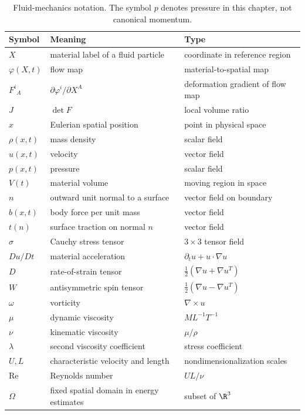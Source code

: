 \begin{table}[htbp]
\centering
\caption{Fluid-mechanics notation. The symbol \(p\) denotes pressure in this
chapter, not canonical momentum.}
\label{tab:fluid-notation}
\small
\begin{tabular}{p{}p{}p{}}
\toprule
Symbol & Meaning & Type\\
\midrule
\(X\) & material label of a fluid particle & coordinate in reference region\\
\(\varphi(X,t)\) & flow map & material-to-spatial map\\
\(F^i{}_A\) & \(\partial\varphi^i/\partial X^A\) & deformation gradient of flow map\\
\(J\) & \(\det F\) & local volume ratio\\
\(x\) & Eulerian spatial position & point in physical space\\
\(\rho(x,t)\) & mass density & scalar field\\
\(u(x,t)\) & velocity & vector field\\
\(p(x,t)\) & pressure & scalar field\\
\(V(t)\) & material volume & moving region in space\\
\(n\) & outward unit normal to a surface & vector field on boundary\\
\(b(x,t)\) & body force per unit mass & vector field\\
\(t(n)\) & surface traction on normal \(n\) & vector field\\
\(\sigma\) & Cauchy stress tensor & \(3\times3\) tensor field\\
\(D u/Dt\) & material acceleration & \(\partial_tu+u\cdot\nabla u\)\\
\(D\) & rate-of-strain tensor & \(\frac12(\nabla u+\nabla u^T)\)\\
\(W\) & antisymmetric spin tensor & \(\frac12(\nabla u-\nabla u^T)\)\\
\(\omega\) & vorticity & \(\nabla\times u\)\\
\(\mu\) & dynamic viscosity & \(ML^{-1}T^{-1}\)\\
\(\nu\) & kinematic viscosity & \(\mu/\rho\)\\
\(\lambda\) & second viscosity coefficient & stress coefficient\\
\(U,L\) & characteristic velocity and length & nondimensionalization scales\\
\(\mathrm{Re}\) & Reynolds number & \(UL/\nu\)\\
\(\Omega\) & fixed spatial domain in energy estimates & subset of \(\R^3\)\\

\end{tabular}
\end{table}
